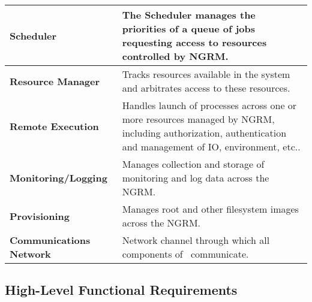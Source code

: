 \begin{tabular}{|p{4cm}|p{12cm}|}\hline
  \textbf{Scheduler} & The Scheduler manages the priorities of a queue
	of jobs requesting access to resources controlled by NGRM.\\
  \hline
  \textbf{Resource Manager} & Tracks resources available in the system and
	arbitrates access to these resources.\\
  \hline
  \textbf{Remote Execution} & Handles launch of processes across one or
	more resources managed by NGRM, including authorization,
	authentication and management of IO, environment, etc..\\
  \hline
  \textbf{Monitoring/Logging} & Manages collection and storage of monitoring
	and log data across the NGRM.\\
  \hline
  \textbf{Provisioning} & Manages root and other filesystem images across
	the NGRM.\\
  \hline
  \textbf{Communications Network} & Network channel through which all
	components of \ngrm\ communicate.\\
  \hline
\end{tabular}

\subsection{High-Level Functional Requirements}\label{ReqsHiLevFun}

